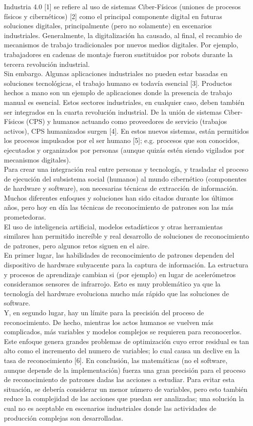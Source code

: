 \documentclass{article}
\begin{document}
Industria 4.0 [1] se refiere al uso de sistemas Ciber-Físicos (uniones de procesos físicos y cibernéticos) [2] como el principal componente digital en futuras soluciones digitales, principalmente (pero no solamente) en escenarios industriales. Generalmente, la digitalización ha causado, al final, el recambio de mecanismos de trabajo tradicionales por nuevos medios digitales. Por ejemplo, trabajadores en cadenas de montaje fueron sustituidos por robots durante la tercera revolución industrial.
\\
Sin embargo. Algunas aplicaciones industriales no pueden estar basadas en soluciones tecnológicas, el trabajo humano es todavía esencial [3]. Productos hechos a mano son un ejemplo de aplicaciones donde la presencia de trabajo manual es esencial. Estos sectores industriales, en cualquier caso, deben también ser integrados en la cuarta revolución industrial. De la unión de sistemas Ciber-Físicos (CPS) y humanos actuando como proveedores de servicio (trabajos activos), CPS humanizados surgen [4]. En estos nuevos sistemas, están permitidos los procesos impulsados por el ser humano [5]; e.g. procesos que son conocidos, ejecutados y organizados por personas (aunque quizás estén siendo vigilados por mecanismos digitales).
\\
Para crear una integración real entre personas y tecnología, y trasladar el proceso de ejecución del subsistema social (humanos) al mundo cibernético (componentes de hardware y software), son necesarias técnicas de extracción de información. Muchos diferentes enfoques y soluciones han sido citados durante los últimos años, pero hoy en día las técnicas de reconocimiento de patrones son las más prometedoras.
\\
El uso de inteligencia artificial, modelos estadísticos y otras herramientas similares han permitido increíble y real desarrollo de soluciones de reconocimiento de patrones, pero algunos retos siguen en el aire.
\\
En primer lugar, las habilidades de reconocimiento de patrones dependen del dispositivo de hardware subyacente para la captura de información. La estructura y procesos de aprendizaje cambian si (por ejemplo) en lugar de acelerómetros consideramos sensores de infrarrojo. Esto es muy problemático ya que la tecnología del hardware evoluciona mucho más rápido que las soluciones de software.
\\
Y, en segundo lugar, hay un límite para la precisión del proceso de reconocimiento. De hecho, mientras los actos humanos se vuelven más complicados, más variables y modelos complejos se requieren para reconocerlos. Este enfoque genera grandes problemas de optimización cuyo error residual es tan alto como el incremento del numero de variables; lo cual causa un declive en la tasa de reconocimiento [6]. En conclusión, las matemáticas (no el software, aunque depende de la implementación) fuerza una gran precisión para el proceso de reconocimiento de patrones dadas las acciones a estudiar. Para evitar esta situación, se debería considerar un menor número de variables, pero esto también reduce la complejidad de las acciones que puedan ser analizadas; una solución la cual no es aceptable en escenarios industriales donde las actividades de producción complejas son desarrolladas.
\end{document}

